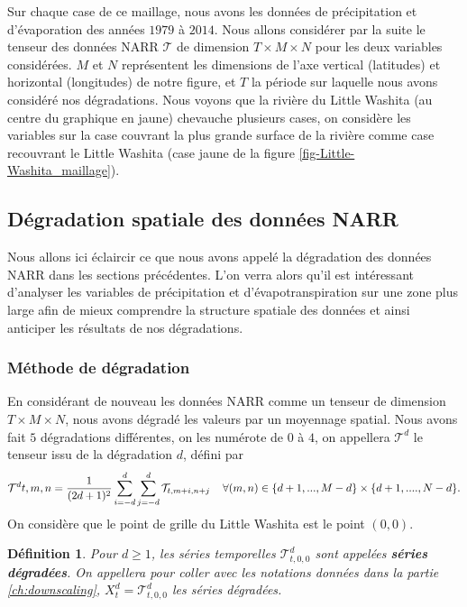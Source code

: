 \documentclass[a4paper,11pt]{article}
\numberwithin{equation}{section}
\newtheorem{definition}{Définition}
\begin{document}
Sur chaque case de ce maillage, nous avons les données de précipitation et d'évaporation des années $1979$ à $2014$. Nous allons considérer par la suite le tenseur des données NARR $\mathcal{T}$ de dimension $T \times M\times N$ pour les deux variables considérées. $M$ et $N$ représentent les dimensions de l'axe vertical (latitudes) et horizontal (longitudes) de notre figure, et $T$ la période sur laquelle nous avons considéré nos dégradations. Nous voyons que la rivière du Little Washita (au centre du graphique en jaune) chevauche plusieurs cases, on considère les variables sur la case couvrant la plus grande surface de la rivière comme case recouvrant le Little Washita (case jaune de la figure \ref{fig-Little-Washita_maillage}).

\subsection{Dégradation spatiale des données NARR}
\label{ch:degradation-NARR}
Nous allons ici éclaircir ce que nous avons appelé la dégradation des données NARR dans les sections précédentes. L'on verra alors qu'il est intéressant d'analyser les variables de précipitation et d'évapotranspiration sur une zone plus large afin de mieux comprendre la structure spatiale des données et ainsi anticiper les résultats de nos dégradations. 

\subsubsection{Méthode de dégradation}

En considérant de nouveau les données NARR comme un tenseur de dimension $T\times M \times N$,
nous avons dégradé les valeurs par un moyennage spatial. Nous avons fait $5$ dégradations différentes, on les numérote de $0$ à $4$, on appellera $\mathcal{T}^{d}$ le tenseur issu de la dégradation $d$, défini par
\begin{equation}
	\label{eq-degradation}
	\mathcal{T}^{d}{t,m,n}=\frac{1}{(2d+1)^2} \sum_{i=-d}^{d}\sum_{j=-d}^{d}\mathcal{T}_{t,m+i,n+j} \hspace{4mm} \forall (m,n) \in \{d+1,...,M-d\}\times\{d+1,...., N-d\}.
\end{equation}
On considère que le point de grille du Little Washita est le point $(0,0)$. 
\begin{definition}
	\label{serie-deg}
	Pour $d\geq1$, les séries temporelles $\mathcal{T}^{d}_{t,0,0}$ sont appelées \textbf{séries dégradées}. On appellera pour coller avec les notations données dans la partie \ref{ch:downscaling}, $X^d_t=\mathcal{T}^{d}_{t,0,0}$ les séries dégradées.
\end{definition}
\end{document}
